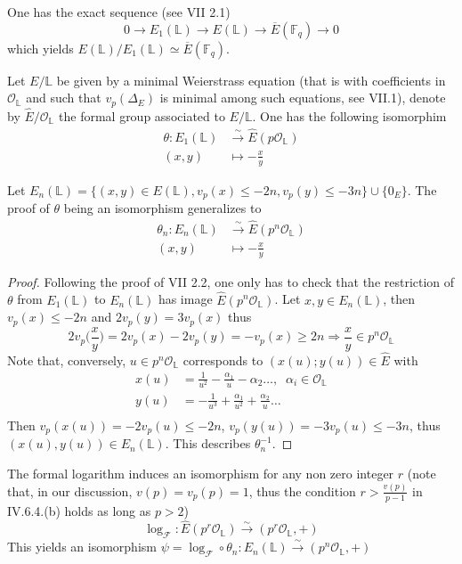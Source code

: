 \documentclass[10pt]{article}
\theoremstyle{definition}
\newcommand{\F}{\mathbb{F}}
\renewcommand{\L}{\mathbb{L}}
\begin{document}
\noindent One has the exact sequence (see \cite{Silverman:EC} VII 2.1)
\[ 0 \to E_1(\L) \to E(\L) \to \overline{E}(\F_q) \to 0 \]
which yields $E(\L) / E_1(\L) \simeq \overline{E}(\F_q)$.

Let $E/ \L$ be given by a minimal Weierstrass equation (that is with coefficients in $\mathcal{O}_{\L}$ and such that $v_p(\Delta_{E})$ is minimal among such equations, see \cite{Silverman:EC} VII.1), denote by $\hat{E} / \mathcal{O}_{\L}$ the formal group associated to $E/\L$.
One has the following isomorphim 
\begin{align*} \theta : E_1(\L) &\xrightarrow{\sim} \hat{E}(p\mathcal{O}_{\L})\\
                   (x,y)& \mapsto - \frac{x}{y} 
\end{align*} 

\noindent Let $E_n(\L)= \lbrace (x,y) \in E(\L), v_p(x) \leq -2n, v_p(y) \leq -3n \rbrace \cup \lbrace 0_E \rbrace$.
The proof of $\theta$ being an isomorphism generalizes to 
\begin{align*} \theta_n : E_n(\L) &\xrightarrow{\sim} \hat{E}(p^n\mathcal{O}_{\L})\\
                   (x,y)& \mapsto - \frac{x}{y} 
\end{align*} 

\begin{proof}
Following the proof of \cite{Silverman:EC} VII 2.2, one only has to check that the restriction of $\theta$ from $E_1(\L)$ to $E_n(\L)$ has image  $\hat{E}(p^n\mathcal{O}_{\L})$.
Let $x,y \in E_n(\L)$, then $v_p(x) \leq -2n $ and $2v_p(y) = 3v_p(x)$ thus
\[ 2v_p\big(\frac{x}{y}\big) = 2 v_p(x) - 2v_p(y) = -v_p(x) \geq 2n  \Rightarrow \frac{x}{y} \in p^n\mathcal{O}_{\L} \]
Note that, conversely, $ u \in p^n \mathcal{O}_{\L}$ corresponds to $(x(u);y(u)) \in \hat{E}$ with
\begin{align*}
x(u) & = \frac{1}{u^2} - \frac{\alpha_1}{u} - \alpha_2 \dots , \; \; \alpha_i \in \mathcal{O}_{\L}\\
y(u) &= -\frac{1}{u^3} + \frac{\alpha_1}{u^2} + \frac{ \alpha_2}{u} \dots \\
\end{align*}
Then $v_p(x(u)) = -2v_p(u) \leq -2n$, $v_p(y(u)) = -3v_p(u) \leq -3n$, thus $(x(u),y(u)) \in E_n(\L)$.
This describes $\theta_n^{-1}$.
\end{proof}

\noindent The formal logarithm induces an isomorphism for any non zero integer $r$ (note that, in our discussion, $v(p) =v_p(p)= 1$, thus the condition $r > \frac{v(p)}{p-1}$ in \cite{Silverman:EC} IV.6.4.(b)  holds as long as $p > 2$) 
\[ \log_{\mathcal{F}} : \hat{E}(p^r\mathcal{O}_{\L}) \xrightarrow{\sim} (p^r\mathcal{O}_{\L},+) \]
This yields an isomorphism $\psi = \log_{\mathcal{F}} \circ \theta_n : E_n(\L) \xrightarrow{\sim} (p^n\mathcal{O}_{\L},+)$
\end{document}
